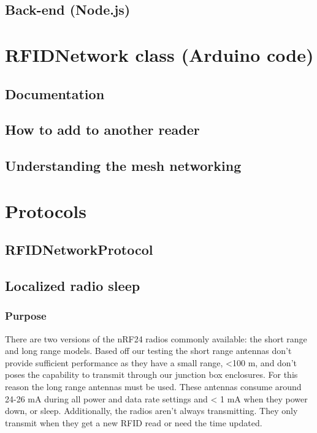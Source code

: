 \documentclass[12pt]{article}
\begin{document}
\begin{lstlisting}[language=html, caption="aaa", breaklines=true]

\end{lstlisting}

\subsection{Back-end (Node.js)}

\section{RFIDNetwork class (Arduino code)}
\subsection{Documentation}
\subsection{How to add to another reader}
\subsection{Understanding the mesh networking}

\section{Protocols}
\subsection{RFIDNetworkProtocol}

\subsection{Localized radio sleep}
	\subsubsection{Purpose}
	There are two versions of the nRF24 radios commonly available: the short range and long range models.  Based off our testing the short range antennas don't provide sufficient performance as they have a small range, <100 m, and don't poses the capability to transmit through our junction box enclosures.  For this reason the long range antennas must be used.  These antennas consume around 24-26 mA during all power and data rate settings and < 1 mA when they power down, or sleep.  Additionally, the radios aren't always transmitting.  They only transmit when they get a new RFID read or need the time updated.
\end{document}
